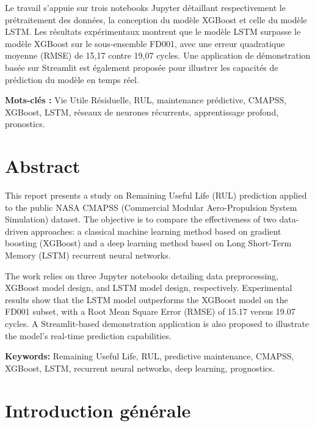 \documentclass[12pt,a4paper]{report}
\theoremstyle{definition}
\begin{document}
Le travail s'appuie sur trois notebooks Jupyter détaillant respectivement le prétraitement des données, la conception du modèle XGBoost et celle du modèle LSTM. Les résultats expérimentaux montrent que le modèle LSTM surpasse le modèle XGBoost sur le sous-ensemble FD001, avec une erreur quadratique moyenne (RMSE) de 15,17 contre 19,07 cycles. Une application de démonstration basée sur Streamlit est également proposée pour illustrer les capacités de prédiction du modèle en temps réel.

\vspace{0.5cm}
\noindent\textbf{Mots-clés :} Vie Utile Résiduelle, RUL, maintenance prédictive, CMAPSS, XGBoost, LSTM, réseaux de neurones récurrents, apprentissage profond, pronostics.

\chapter*{Abstract}

This report presents a study on Remaining Useful Life (RUL) prediction applied to the public NASA CMAPSS (Commercial Modular Aero-Propulsion System Simulation) dataset. The objective is to compare the effectiveness of two data-driven approaches: a classical machine learning method based on gradient boosting (XGBoost) and a deep learning method based on Long Short-Term Memory (LSTM) recurrent neural networks.

The work relies on three Jupyter notebooks detailing data preprocessing, XGBoost model design, and LSTM model design, respectively. Experimental results show that the LSTM model outperforms the XGBoost model on the FD001 subset, with a Root Mean Square Error (RMSE) of 15.17 versus 19.07 cycles. A Streamlit-based demonstration application is also proposed to illustrate the model's real-time prediction capabilities.

\vspace{0.5cm}
\noindent\textbf{Keywords:} Remaining Useful Life, RUL, predictive maintenance, CMAPSS, XGBoost, LSTM, recurrent neural networks, deep learning, prognostics.

\tableofcontents
\listoffigures
\listoftables

\chapter{Introduction générale}
\end{document}
